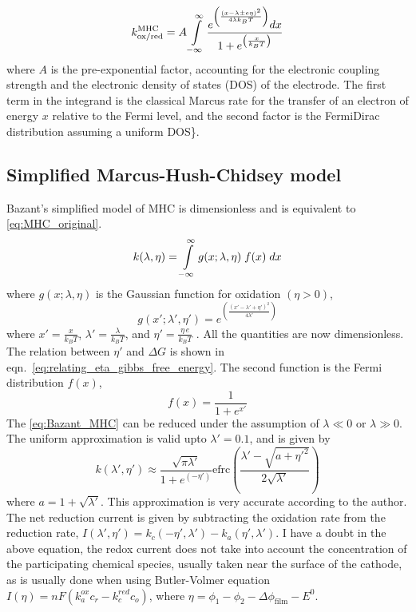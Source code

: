 \documentclass[12pt]{book}
\begin{document}
\begin{equation}
k_{\textrm{ox/red}}^{\textrm{MHC}}=A\intop_{-\infty}^{\infty}\frac{e^{\left(\frac{\left(x-\lambda\pm e\eta\right)^{2}}{4\lambda k_{B}T}\right)}dx}{1+e^{\left(\frac{x}{k_{B}T}\right)}}\label{eq:MHC_original}
\end{equation}
where $A$ is the pre-exponential factor, accounting for the electronic coupling strength and the electronic density of states (DOS) of the electrode. The first term in the integrand is the classical Marcus rate for the transfer of an electron of energy $x$ relative to the Fermi level, and the second factor is the Fermi\textendash Dirac distribution assuming a uniform DOS\cite{Zeng2014}\}. 
\subsection{Simplified Marcus-Hush-Chidsey model}
Bazant's simplified model of MHC is dimensionless and is equivalent
to \ref{eq:MHC_original}.
\begin{equation}
k(\lambda,\eta)=\intop_{-\infty}^{\infty}g(x;\lambda,\eta)\;f(x)\;dx\label{eq:Bazant_MHC}
\end{equation}
where $g(x;\lambda,\eta)$ is the Gaussian function for oxidation $(\eta>0)$,
\begin{equation}
g(x';\lambda',\eta')=e^{\left(\frac{\left(x'- \lambda' +\eta'\right)^{2}}{4\lambda'} \right)}
\end{equation}
where $x'=\frac{x}{k_{B}T}$, $\lambda'=\frac{\lambda}{k_{B}T}$, and $\eta'=\frac{\eta\,e}{k_{B}T}$ . All the quantities are now dimensionless. The relation between $\eta'$ and $\Delta G$ is shown in eqn.~\ref{eq:relating_eta_gibbs_free_energy}. The second function is the Fermi distribution $f(x)$,
\begin{equation}
f(x)=\frac{1}{1+e^{x'}}
\end{equation}
The \ref{eq:Bazant_MHC} can be reduced under the assumption of $\lambda\ll0$ or $\lambda\gg0$. The uniform approximation is valid upto $\lambda'=0.1$, and is given by
\begin{equation}
k(\lambda',\eta')\approx\frac{\sqrt{\pi\lambda'}}{1+e^{(-\eta')}}\textrm{efrc}\left(\frac{\lambda'-\sqrt{a+\eta'^{2}}}{2\sqrt{\lambda'}}\right)\label{eq:MHC_reaction_rate_under_dc}
\end{equation}
where $a=1+\sqrt{\lambda'}$. This approximation is very accurate according to the author. The net reduction current is given by subtracting the oxidation rate from the reduction rate, $I\left(\lambda',\eta'\right)=k_{c}(-\eta',\lambda')-k_{a}(\eta',\lambda')$. I have a doubt in the above equation, the redox current does not take into account the concentration of the participating chemical species, usually taken near the surface of the cathode, as is usually done when using Butler-Volmer equation $I\left(\eta\right)=nF\left(k_{a}^{ox}c_{r}-k_{c}^{red}c_{o}\right)$, where $\eta=\phi_{1}-\phi_{2}-\Delta\phi_{\textrm{film}}-E^{0}$.
\end{document}
